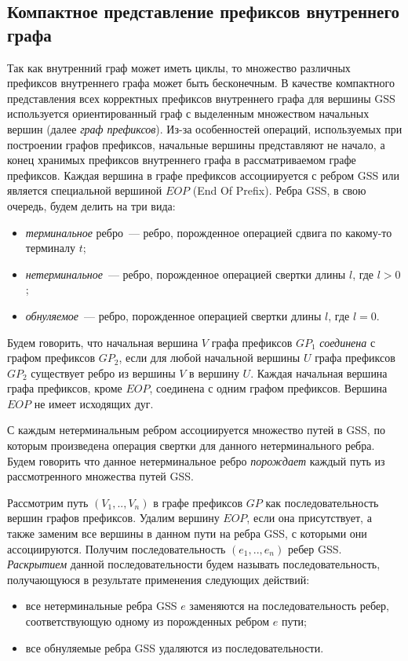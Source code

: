 \subsection{Компактное представление префиксов внутреннего графа}
Так как внутренний граф может иметь циклы, то множество различных префиксов внутреннего графа может быть бесконечным. В качестве компактного представления всех корректных префиксов внутреннего графа для вершины GSS используется ориентированный граф с выделенным множеством начальных вершин (далее \emph{граф префиксов}). Из-за особенностей операций, используемых при построении графов префиксов, начальные вершины представляют не начало, а конец хранимых префиксов внутреннего графа в рассматриваемом графе префиксов. Каждая вершина в графе префиксов ассоциируется с ребром GSS или является специальной вершиной $EOP$ (End Of Prefix). Ребра GSS, в свою очередь, будем делить на три вида:
\begin{itemize}
    \item  \emph{терминальное} ребро~--- ребро, порожденное операцией сдвига по какому-то терминалу $t$;
    \item \emph{нетерминальное}~--- ребро, порожденное операцией свертки длины $l$, где $l > 0$;
    \item \emph{обнуляемое}~--- ребро, порожденное операцией свертки длины $l$, где $l = 0$.
\end{itemize}
Будем говорить, что начальная вершина $V$ графа префиксов $GP_{1}$ \emph{соединена} с графом префиксов $GP_{2}$, если для любой начальной вершины $U$ графа префиксов $GP_{2}$ существует ребро из вершины $V$ в вершину $U$. Каждая начальная вершина графа префиксов, кроме $EOP$, соединена с одним графом префиксов. Вершина $EOP$ не имеет исходящих дуг.

С каждым нетерминальным ребром ассоциируется множество путей в GSS, по которым произведена операция свертки для данного нетерминального ребра. Будем говорить что данное нетерминальное ребро \emph{порождает} каждый путь из рассмотренного множества путей GSS.
% 

Рассмотрим путь $(V_{1},..,V_{n})$ в графе префиксов $GP$ как последовательность вершин графов префиксов. Удалим вершину $EOP$, если она присутствует, а также заменим все вершины в данном пути на ребра GSS, с которыми они ассоциируются. Получим последовательность $(e_{1},..,e_{n})$ ребер GSS. \emph{Раскрытием} данной последовательности будем называть последовательность, получающуюся в результате применения следующих действий:
\begin{itemize}
    \item все нетерминальные ребра GSS $e$ заменяются на последовательность ребер, соответствующую одному из порожденных ребром $e$ пути;
    \item все обнуляемые ребра GSS удаляются из последовательности.
\end{itemize}

